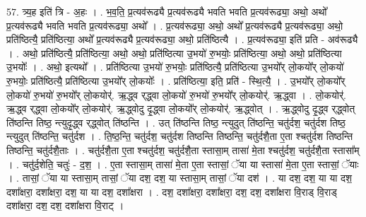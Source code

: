 \documentclass[17pt]{extarticle}
\begin{document}
57. त्र्य॒ह इति॑ त्रि - अ॒हः । . भ॒व॒ति॒ प्र॒त्यव॑रूढ्यै प्र॒त्यव॑रूढ्यै भवति भवति प्र॒त्यव॑रूढ्या॒ अथो॒ अथो᳚ प्र॒त्यव॑रूढ्यै भवति भवति प्र॒त्यव॑रूढ्या॒ अथो᳚ । . प्र॒त्यव॑रूढ्या॒ अथो॒ अथो᳚ प्र॒त्यव॑रूढ्यै प्र॒त्यव॑रूढ्या॒ अथो॒ प्रति॑ष्ठित्यै॒ प्रति॑ष्ठित्या॒ अथो᳚ प्र॒त्यव॑रूढ्यै प्र॒त्यव॑रूढ्या॒ अथो॒ प्रति॑ष्ठित्यै । . प्र॒त्यव॑रूढ्या॒ इति॑ प्रति - अव॑रूढ्यै । . अथो॒ प्रति॑ष्ठित्यै॒ प्रति॑ष्ठित्या॒ अथो॒ अथो॒ प्रति॑ष्ठित्या उ॒भयो॑ रु॒भयोः॒ प्रति॑ष्ठित्या॒ अथो॒ अथो॒ प्रति॑ष्ठित्या उ॒भयोः᳚ । . अथो॒ इत्यथो᳚ । . प्रति॑ष्ठित्या उ॒भयो॑ रु॒भयोः॒ प्रति॑ष्ठित्यै॒ प्रति॑ष्ठित्या उ॒भयो᳚र् लो॒कयो᳚र् लो॒कयो॑ रु॒भयोः॒ प्रति॑ष्ठित्यै॒ प्रति॑ष्ठित्या उ॒भयो᳚र् लो॒कयोः᳚ । . प्रति॑ष्ठित्या॒ इति॒ प्रति॑ - स्थि॒त्यै॒ । . उ॒भयो᳚र् लो॒कयो᳚र् लो॒कयो॑ रु॒भयो॑ रु॒भयो᳚र् लो॒कयोर्॑. ऋ॒द्ध्व र्‌द्ध्वा लो॒कयो॑ रु॒भयो॑ रु॒भयो᳚र् लो॒कयोर्॑. ऋ॒द्ध्वा । . लो॒कयोर्॑. ऋ॒द्ध्व र्‌द्ध्वा लो॒कयो᳚र् लो॒कयोर्॑. ऋ॒द्ध्वोदु दृ॒द्ध्वा लो॒कयो᳚र् लो॒कयोर्॑. ऋ॒द्ध्वोत् । . ऋ॒द्ध्वोदु दृ॒द्ध्व र्‌द्ध्वोत् ति॑ष्ठन्ति तिष्ठ॒ न्त्युदृ॒द्ध्व र्‌द्ध्वोत् ति॑ष्ठन्ति । . उत् ति॑ष्ठन्ति तिष्ठ॒ न्त्युदुत् ति॑ष्ठन्ति॒ चतु॑र्दश॒ चतु॑र्दश तिष्ठ॒ न्त्युदुत् ति॑ष्ठन्ति॒ चतु॑र्दश । . ति॒ष्ठ॒न्ति॒ चतु॑र्दश॒ चतु॑र्दश तिष्ठन्ति तिष्ठन्ति॒ चतु॑र्दशै॒ता ए॒ता श्चतु॑र्दश तिष्ठन्ति तिष्ठन्ति॒ चतु॑र्दशै॒ताः । . चतु॑र्दशै॒ता ए॒ता श्चतु॑र्दश॒ चतु॑र्दशै॒ता स्तासा॒म् तासा॑ मे॒ता श्चतु॑र्दश॒ चतु॑र्दशै॒ता स्तासा᳚म् । . चतु॑र्द॒शेति॒ चतुः॑ - द॒श॒ । . ए॒ता स्तासा॒म् तासा॑ मे॒ता ए॒ता स्तासां॒ ॅया या स्तासा॑ मे॒ता ए॒ता स्तासां॒ ॅयाः । . तासां॒ ॅया या स्तासा॒म् तासां॒ ॅया दश॒ दश॒ या स्तासा॒म् तासां॒ ॅया दश॑ । . या दश॒ दश॒ या या दश॒ दशा᳚क्षरा॒ दशा᳚क्षरा॒ दश॒ या या दश॒ दशा᳚क्षरा । . दश॒ दशा᳚क्षरा॒ दशा᳚क्षरा॒ दश॒ दश॒ दशा᳚क्षरा वि॒राड् वि॒राड् दशा᳚क्षरा॒ दश॒ दश॒ दशा᳚क्षरा वि॒राट् । \newline
\end{document}
